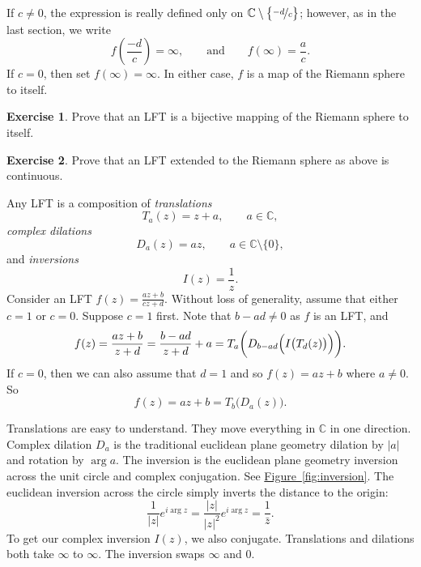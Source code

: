 \documentclass[12pt,openany]{book}
\newcommand{\sabs}[1]{\lvert {#1} \rvert}
\newcommand{\C}{{\mathbb{C}}}
\theoremstyle{plain}
\theoremstyle{remark}
\theoremstyle{definition}
\newenvironment{exbox}{%
    \def\FrameCommand{\vrule width 1pt \relax\hspace{10pt}}%
    \MakeFramed{\advance\hsize-\width\FrameRestore}%
}{%
    \endMakeFramed
}
\theoremstyle{exercise}
\newtheorem{exercise}{Exercise}[section]
\theoremstyle{example}
\newcommand{\figureref}[1]{\hyperref[#1]{Figure~\ref*{#1}}}
\begin{document}
If $c \neq 0$,
the expression is really defined only on
$\C \setminus \bigl\{ \nicefrac{-d}{c} \bigr\}$;
however, as in the last section, we write
\begin{equation*}
f\left(\frac{-d}{c}\right) = \infty, \qquad \text{and} \qquad
f(\infty) = \frac{a}{c} .
\end{equation*}
If $c=0$, then set $f(\infty) = \infty$.  In either case, $f$ is a map of
the Riemann sphere to itself.

\begin{exbox}
\begin{exercise}%
Prove that an LFT is a bijective mapping of the Riemann sphere to itself.
\end{exercise}

\begin{exercise}%
Prove that an LFT extended to the Riemann sphere as above is continuous.
\end{exercise}
\end{exbox}

Any LFT is a composition of \emph{translations}
\begin{equation*}
T_a(z) = z + a , \qquad a \in \C,
\end{equation*}
\emph{complex dilations}
\begin{equation*}
D_a(z) = az , \qquad a \in \C \setminus \{ 0 \} ,
\end{equation*}
and \emph{inversions}
\begin{equation*}
I(z) = \frac{1}{z}.
\end{equation*}
Consider an LFT $f(z) = \frac{az+b}{cz+d}$.
Without loss of generality, assume that either $c=1$ or $c=0$.
Suppose $c=1$ first.  Note that $b-ad \neq 0$ as
$f$ is an LFT, and
\begin{equation*}
f(z)
=
\frac{a z + b}{z + d}
=
\frac{b-ad}{z+d}+a
=
T_a\biggl(D_{b-ad}\Bigl(I\bigl(T_d(z)\bigr)\Bigr)\biggr) .
\end{equation*}
If $c=0$, then we can also assume that $d=1$ and
so $f(z) = az + b$ where $a \neq 0$.  So
\begin{equation*}
f(z) = az+b = T_b\bigl(D_a(z)\bigr) .
\end{equation*}

Translations are easy to understand.
They move everything in $\C$ in one direction.
Complex
dilation $D_a$ is the traditional euclidean plane geometry dilation by $\sabs{a}$
and rotation by $\arg a$.
The inversion is the euclidean plane geometry inversion
across the unit circle
and complex conjugation.  See \figureref{fig:inversion}.  The euclidean
inversion across the circle simply inverts the distance to the origin:
\begin{equation*}
\frac{1}{\sabs{z}} e^{i \arg z} = 
\frac{\sabs{z}}{\sabs{z}^2} e^{i \arg z} = \frac{1}{\bar{z}} .
\end{equation*}
To get our complex inversion $I(z)$, we also conjugate.
Translations and dilations both take $\infty$ to $\infty$.
The inversion swaps $\infty$ and $0$.
\end{document}
